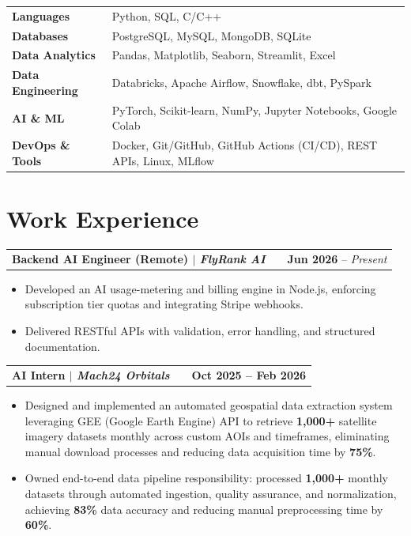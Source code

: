 \documentclass[a4paper,10.5pt]{article}
\makeatletter
\newenvironment{joblong}[2]
    {
    \begin{tabularx}{\linewidth}{@{}l X r@{}}
    \textbf{#1} & \hfill &  #2 \\[2pt]
    \end{tabularx}
    \begin{minipage}[t]{\linewidth}
    \begin{itemize}[nosep,after=\strut, leftmargin=1em, itemsep=1pt,label=--]
    }
    {
    \end{itemize}
    \end{minipage}    
    }
\makeatother
\begin{document}
\vspace{5pt}

\begin{tabularx}{\linewidth}{@{}l X@{}}
\textbf{Languages}          & Python, SQL, C/C++ \\
\textbf{Databases}          & PostgreSQL, MySQL, MongoDB, SQLite \\
\textbf{Data Analytics}     & Pandas, Matplotlib, Seaborn, Streamlit, Excel \\
\textbf{Data Engineering}   & Databricks, Apache Airflow, Snowflake, dbt, PySpark \\
\textbf{AI \& ML}           & PyTorch, Scikit-learn, NumPy, Jupyter Notebooks, Google Colab \\
\textbf{DevOps \& Tools}    & Docker, Git/GitHub, GitHub Actions (CI/CD), REST APIs, Linux, MLflow \\
\end{tabularx}

\section{Work Experience}

\vspace{5pt}

\begin{joblong}{Backend AI Engineer (Remote) $|$ \normalfont\textit{FlyRank AI}}{\textbf{Jun 2026} -- \textit{Present}}
\item Developed an AI usage-metering and billing engine in Node.js, enforcing subscription tier quotas and integrating Stripe webhooks. 
\item Delivered RESTful APIs with validation, error handling, and structured documentation.
\end{joblong}

\vspace{1pt}

\begin{joblong}{AI Intern $|$ \normalfont\textit{Mach24 Orbitals}}{\textbf{Oct 2025 -- Feb 2026}}
\item Designed and implemented an automated geospatial data extraction system leveraging GEE (Google Earth Engine) API to retrieve \textbf{1,000+} satellite imagery datasets monthly across custom AOIs and timeframes, eliminating manual download processes and reducing data acquisition time by \textbf{75\%}.
\item Owned end-to-end data pipeline responsibility: processed \textbf{1,000+} monthly datasets through automated ingestion, quality assurance, and normalization, achieving \textbf{83\%} data accuracy and reducing manual preprocessing time by \textbf{60\%}.
\end{joblong}
\end{document}
